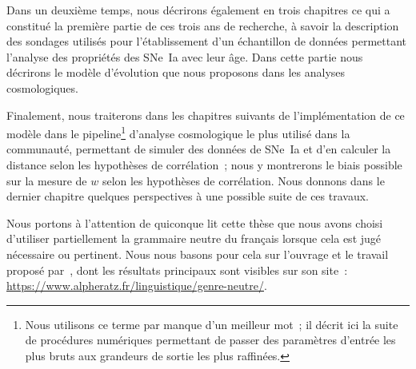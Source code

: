 \documentclass[../main/main.tex]{subfiles}
\begin{document}
Dans un deuxième temps, nous décrirons également en trois chapitres ce qui a
constitué la première partie de ces trois ans de recherche, à savoir la
description des sondages utilisés pour l'établissement d'un échantillon de
données permettant l'analyse des propriétés des SNe~Ia avec leur âge. Dans cette
partie nous décrirons le modèle d'évolution que nous proposons dans les analyses
cosmologiques.

Finalement, nous traiterons dans les chapitres suivants de l'implémentation de
ce modèle dans le pipeline\footnote{Nous utilisons ce terme par manque d'un
    meilleur mot~; il décrit ici la suite de procédures numériques permettant de
    passer des paramètres d'entrée les plus bruts aux grandeurs de sortie les
plus raffinées.} d'analyse cosmologique le plus utilisé dans la communauté,
permettant de simuler des données de SNe~Ia et d'en calculer la distance
selon les hypothèses de corrélation~; nous y montrerons le biais possible
sur la mesure de $w$ selon les hypothèses de corrélation. Nous donnons dans
le dernier chapitre quelques perspectives à une possible suite de ces
travaux.

\vfill

Nous portons à l'attention de quiconque lit cette thèse que nous avons choisi
d'utiliser partiellement la grammaire neutre du français lorsque cela est jugé
nécessaire ou pertinent. Nous nous basons pour cela sur l'ouvrage et le travail
proposé par~\cite{alpheratz2018}, dont les résultats principaux sont visibles
sur son site~: \href{https://www.alpheratz.fr/linguistique/genre-neutre/}
{https://www.alpheratz.fr/linguistique/genre-neutre/}.

\vfill

% 
% 
\end{document}
